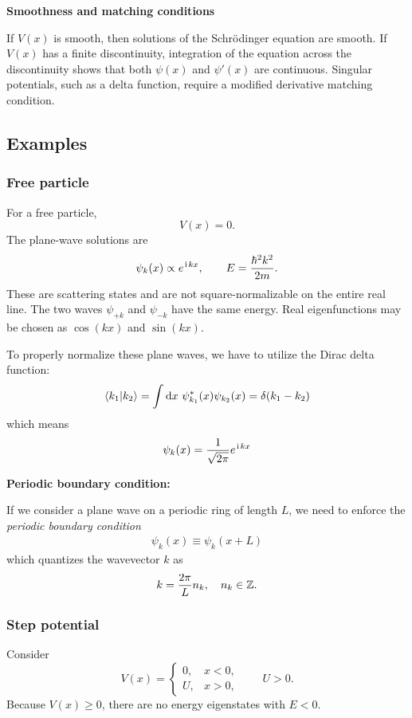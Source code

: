 \textbf{Smoothness and matching conditions}

If $V(x)$ is smooth, then solutions of the Schr\"odinger equation are smooth.
If $V(x)$ has a finite discontinuity, integration of the equation across the
discontinuity shows that both $\psi(x)$ and $\psi'(x)$
are continuous. Singular potentials, such as a delta function, require a
modified derivative matching condition.

\subsection{Examples}

\subsubsection{Free particle}
For a free particle,
\begin{equation}
 V(x)=0.
\end{equation}
The plane-wave solutions are
\begin{equation}
 \psi_k(x)\propto e^{\hspace{1pt}\mathrm{i}\hspace{1pt} kx},
 \qquad
 E=\frac{\hbar^2k^2}{2m}.
\end{equation}
These are scattering states and are not square-normalizable on the entire
real line. The two waves $\psi_{+k}$ and $\psi_{-k}$ have the same energy.
Real eigenfunctions may be chosen as $\cos(kx)$ and $\sin(kx)$. 

To properly normalize these plane waves, we have to utilize the Dirac delta function:
\begin{align}
    \langle{k_1|k_2}\rangle=\int\mathrm{d}{x}~\psi_{k_1}^\ast(x)\psi_{k_2}(x)=\delta(k_1-k_2)
\end{align}
which means
\begin{align}
    \psi_k(x)=\frac1{\sqrt{2\pi}}e^{\hspace{1pt}\mathrm{i}\hspace{1pt} kx}
\end{align}


\textbf{Periodic boundary condition:}

If we consider a plane wave on a periodic ring of length $L$, we need to enforce the \emph{periodic boundary condition} 
\begin{align}
    \psi_k(x)\equiv\psi_k(x+L)
\end{align}
which quantizes the wavevector $k$ as 
\begin{align}
    k=\frac{2\pi}{L}n_k,~~~n_k\in{\mathbb{Z}}.
\end{align}


\subsubsection{Step potential}
Consider
\begin{equation}
 V(x)=
 \begin{cases}
 0, & x<0,\\
 U, & x>0,
 \end{cases}
 \qquad U>0.
\end{equation}
Because $V(x)\geq0$, there are no energy eigenstates with $E<0$.

